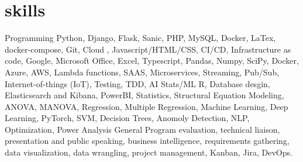 \documentclass[]{twentysecondcv}
\begin{document}
\section{skills}
	\begin{twentyshort}
	\twentyitemshort
	{Programming}
	{Python, Django, Flask, Sanic, PHP, MySQL, Docker, LaTex, docker-compose, Git, Cloud , Javascript/HTML/CSS, CI/CD, Infrastructure as code, Google, Microsoft Office, Excel, Typescript, Pandas, Numpy, SciPy, Docker, Azure, AWS, Lambda functions, SAAS, Microservices,  Streaming, Pub/Sub, Internet-of-things (IoT), Testing, TDD, AI}
	\twentyitemshort
	{Stats/ML}
	{R, Database desgin, Elasticsearch and Kibana, PowerBI, Statistics, Structural Equation Modeling, ANOVA, MANOVA, Regression, Multiple Regression, Machine Learning, Deep Learning, PyTorch, SVM, Decision Trees, Anomoly Detection, NLP, Optimization, Power Analysis}
	\twentyitemshort
	{General}
	{Program evaluation, technical liaison, presentation and public speaking, business intelligence, requirements gathering, data visualization, data wrangling, project management, Kanban, Jira, DevOps.}
	\end{twentyshort}

\end{document}
